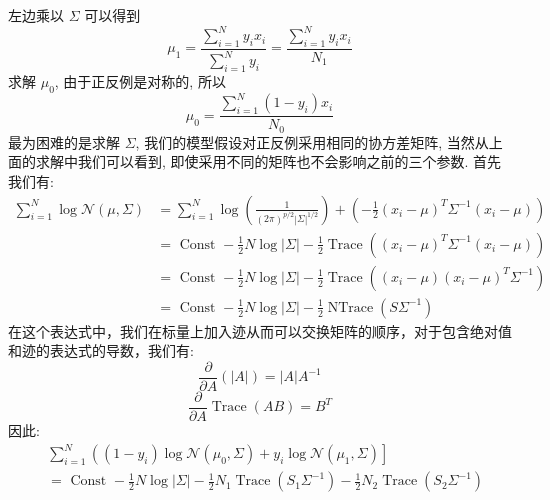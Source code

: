 左边乘以 $\Sigma$ 可以得到
\begin{equation}
\mu_{1}=\frac{\sum_{i=1}^{N} y_{i} x_{i}}{\sum_{i=1}^{N} y_{i}}=\frac{\sum_{i=1}^{N} y_{i} x_{i}}{N_{1}}
​\end{equation}
求解 $\mu_0$, 由于正反例是对称的, 所以
\begin{equation}
\mu_{0}=\frac{\sum_{i=1}^{N}\left(1-y_{i}\right) x_{i}}{N_{0}}
​\end{equation}
最为困难的是求解 $\Sigma$, 我们的模型假设对正反例采用相同的协方差矩阵, 当然从上面的求解中我们可以看到, 即使采用不同的矩阵也不会影响之前的三个参数. 首先我们有:
\begin{equation}
\begin{aligned}
\sum_{i=1}^{N} \log \mathcal{N}(\mu, \Sigma) & =\sum_{i=1}^{N} \log \left(\frac{1}{(2 \pi)^{p / 2}|\Sigma|^{1 / 2}}\right)+\left(-\frac{1}{2}\left(x_{i}-\mu\right)^{T} \Sigma^{-1}\left(x_{i}-\mu\right)\right) \\
& =\text { Const }-\frac{1}{2} N \log |\Sigma|-\frac{1}{2} \operatorname{Trace}\left(\left(x_{i}-\mu\right)^{T} \Sigma^{-1}\left(x_{i}-\mu\right)\right) \\
& =\text { Const }-\frac{1}{2} N \log |\Sigma|-\frac{1}{2} \operatorname{Trace}\left(\left(x_{i}-\mu\right)\left(x_{i}-\mu\right)^{T} \Sigma^{-1}\right) \\
& =\text { Const }-\frac{1}{2} N \log |\Sigma|-\frac{1}{2} \operatorname{NTrace}\left(S \Sigma^{-1}\right)
\end{aligned}
​\end{equation}
在这个表达式中，我们在标量上加入迹从而可以交换矩阵的顺序，对于包含绝对值和迹的表达式的导数，我们有:
\begin{equation}
\frac{\partial}{\partial A}(|A|)=|A| A^{-1}
​\end{equation}
\begin{equation}
\frac{\partial}{\partial A} \operatorname{Trace}(A B)=B^{T}
​\end{equation}
因此:
\begin{equation}
\begin{aligned}
&\sum_{i=1}^{N}\left(\left(1-y_{i}\right) \log \mathcal{N}\left(\mu_{0}, \Sigma\right)+y_{i} \log \mathcal{N}\left(\mu_{1}, \Sigma\right)\right] \\
&=\text { Const }-\frac{1}{2} N \log |\Sigma|-\frac{1}{2} N_{1} \operatorname{Trace}\left(S_{1} \Sigma^{-1}\right)-\frac{1}{2} N_{2} \operatorname{Trace}\left(S_{2} \Sigma^{-1}\right) \label{con:2.11.11} 
\end{aligned}
​\end{equation}
